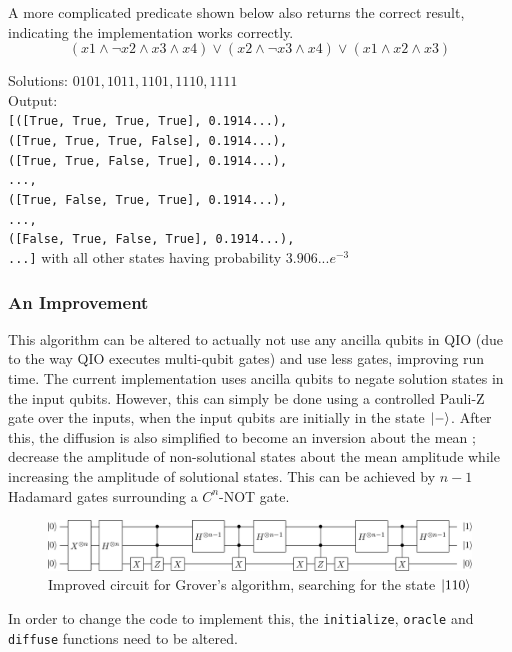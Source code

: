 \documentclass[a4paper,10pt, titlepage, twoside]{article}
\begin{document}
A more complicated predicate shown below also returns the correct result, indicating the implementation works correctly. 
$$(x1 \land \neg x2 \land x3 \land x4) \lor (x2 \land \neg x3 \land x4) \lor (x1 \land x2 \land x3)$$
\begin{center}
Solutions: $0101, 1011, 1101, 1110, 1111$\\
Output: \\\texttt{[([True, True, True, True], 0.1914...),\\ ([True, True, True, False], 0.1914...),\\ ([True, True, False, True], 0.1914...),\\...,\\ ([True, False, True, True], 0.1914...),\\...,\\ ([False, True, False, True], 0.1914...), \\...]} with all other states having probability $3.906...e^{-3}$
\end{center}

\subsubsection{An Improvement}
This algorithm can be altered to actually not use any ancilla qubits in QIO  (due to the way QIO executes multi-qubit gates) and use less gates, improving run time. The current implementation uses ancilla qubits to negate solution states in the input qubits. However, this can simply be done using a controlled Pauli-Z gate over the inputs, when the input qubits are initially in the state $\ket{-}$. After this, the diffusion is also simplified to become an inversion about the mean \cite{groverblog}; decrease the amplitude of non-solutional states about the mean amplitude while increasing the amplitude of solutional states. This can be achieved by $n-1$ Hadamard gates surrounding a $C^n$-NOT gate.\par

\begin{figure}[H]
    \centering
    \includegraphics[width=\textwidth]{groverImp}
    \caption{Improved circuit for Grover's algorithm, searching for the state $\ket{110}$}
\end{figure}

In order to change the code to implement this, the \texttt{initialize}, \texttt{oracle} and \texttt{diffuse} functions need to be altered.
\end{document}
